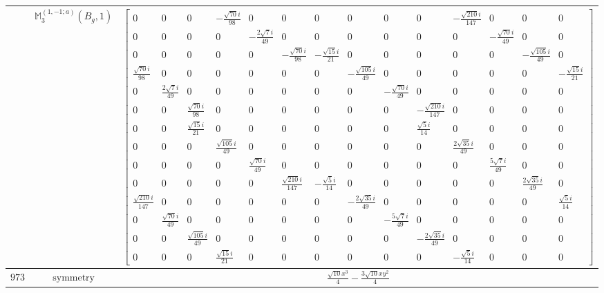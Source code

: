 \documentclass[fleqn,8pt,landscape]{jsarticle}
\begin{document}
\begin{longtable}{ccc}
$  $ & $ \mathbb{M}_{3}^{(1,-1;a)}(B_{g},1) $ & $ \begin{bmatrix} 0 & 0 & 0 & - \frac{\sqrt{70} i}{98} & 0 & 0 & 0 & 0 & 0 & 0 & - \frac{\sqrt{210} i}{147} & 0 & 0 & 0 \\ 0 & 0 & 0 & 0 & - \frac{2 \sqrt{7} i}{49} & 0 & 0 & 0 & 0 & 0 & 0 & - \frac{\sqrt{70} i}{49} & 0 & 0 \\ 0 & 0 & 0 & 0 & 0 & - \frac{\sqrt{70} i}{98} & - \frac{\sqrt{15} i}{21} & 0 & 0 & 0 & 0 & 0 & - \frac{\sqrt{105} i}{49} & 0 \\ \frac{\sqrt{70} i}{98} & 0 & 0 & 0 & 0 & 0 & 0 & - \frac{\sqrt{105} i}{49} & 0 & 0 & 0 & 0 & 0 & - \frac{\sqrt{15} i}{21} \\ 0 & \frac{2 \sqrt{7} i}{49} & 0 & 0 & 0 & 0 & 0 & 0 & - \frac{\sqrt{70} i}{49} & 0 & 0 & 0 & 0 & 0 \\ 0 & 0 & \frac{\sqrt{70} i}{98} & 0 & 0 & 0 & 0 & 0 & 0 & - \frac{\sqrt{210} i}{147} & 0 & 0 & 0 & 0 \\ 0 & 0 & \frac{\sqrt{15} i}{21} & 0 & 0 & 0 & 0 & 0 & 0 & \frac{\sqrt{5} i}{14} & 0 & 0 & 0 & 0 \\ 0 & 0 & 0 & \frac{\sqrt{105} i}{49} & 0 & 0 & 0 & 0 & 0 & 0 & \frac{2 \sqrt{35} i}{49} & 0 & 0 & 0 \\ 0 & 0 & 0 & 0 & \frac{\sqrt{70} i}{49} & 0 & 0 & 0 & 0 & 0 & 0 & \frac{5 \sqrt{7} i}{49} & 0 & 0 \\ 0 & 0 & 0 & 0 & 0 & \frac{\sqrt{210} i}{147} & - \frac{\sqrt{5} i}{14} & 0 & 0 & 0 & 0 & 0 & \frac{2 \sqrt{35} i}{49} & 0 \\ \frac{\sqrt{210} i}{147} & 0 & 0 & 0 & 0 & 0 & 0 & - \frac{2 \sqrt{35} i}{49} & 0 & 0 & 0 & 0 & 0 & \frac{\sqrt{5} i}{14} \\ 0 & \frac{\sqrt{70} i}{49} & 0 & 0 & 0 & 0 & 0 & 0 & - \frac{5 \sqrt{7} i}{49} & 0 & 0 & 0 & 0 & 0 \\ 0 & 0 & \frac{\sqrt{105} i}{49} & 0 & 0 & 0 & 0 & 0 & 0 & - \frac{2 \sqrt{35} i}{49} & 0 & 0 & 0 & 0 \\ 0 & 0 & 0 & \frac{\sqrt{15} i}{21} & 0 & 0 & 0 & 0 & 0 & 0 & - \frac{\sqrt{5} i}{14} & 0 & 0 & 0 \end{bmatrix} $ \\ \hline
$ 973 $ & $ \text{symmetry} $ & $ \frac{\sqrt{10} x^{3}}{4} - \frac{3 \sqrt{10} x y^{2}}{4} $ \\

\end{longtable}
\end{document}
